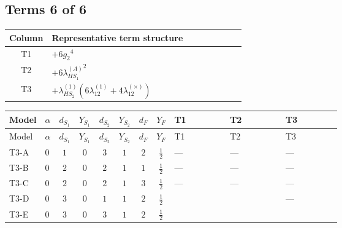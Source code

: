 \documentclass[8pt]{article}
\begin{document}
\begin{landscape}
\subsection*{Terms 6 of 6}
\begin{center}
\begin{tabular}{@{}c >{\raggedright\arraybackslash}p{0.82\linewidth}@{}}
\toprule
Column & Representative term structure \\
\midrule
T1 & \(\displaystyle +6 {g_2}^4\) \\
\midrule
T2 & \(\displaystyle +6 {\lambda_{HS_1}^{(A)}}^2\) \\
\midrule
T3 & \(\displaystyle +{\lambda_{HS_2}^{(1)}} (6 {\lambda_{12}^{(1)}}+4 {\lambda_{12}^{(\times)}})\) \\
\midrule
\bottomrule
\end{tabular}
\end{center}
\smallskip
\tiny
\begin{longtable}{@{}llcccccc >{\raggedright\arraybackslash}p{0.21\linewidth} >{\raggedright\arraybackslash}p{0.21\linewidth} >{\raggedright\arraybackslash}p{0.21\linewidth}@{}}
\toprule
Model & $\alpha$ & $d_{S_1}$ & $Y_{S_1}$ & $d_{S_2}$ & $Y_{S_2}$ & $d_F$ & $Y_F$ & T1 & T2 & T3 \\
\midrule
\endfirsthead
\toprule
Model & $\alpha$ & $d_{S_1}$ & $Y_{S_1}$ & $d_{S_2}$ & $Y_{S_2}$ & $d_F$ & $Y_F$ & T1 & T2 & T3 \\
\midrule
\endhead
T3-A & $0$ & $1$ & $0$ & $3$ & $1$ & $2$ & $\frac{1}{2}$ & --- & --- & --- \\
\midrule
T3-B & $0$ & $2$ & $0$ & $2$ & $1$ & $1$ & $\frac{1}{2}$ & --- & --- & --- \\
\midrule
T3-C & $0$ & $2$ & $0$ & $2$ & $1$ & $3$ & $\frac{1}{2}$ & --- & --- & --- \\
\midrule
T3-D & $0$ & $3$ & $0$ & $1$ & $1$ & $2$ & $\frac{1}{2}$ & \scriptsize\adjustbox{max width=\linewidth}{$\begin{gathered} +6 {g_2}^4\end{gathered}$} & \scriptsize\adjustbox{max width=\linewidth}{$\begin{gathered} +6 {\lambda_{HS_1}^{(A)}}^2\end{gathered}$} & --- \\
\midrule
T3-E & $0$ & $3$ & $0$ & $3$ & $1$ & $2$ & $\frac{1}{2}$ & \scriptsize\adjustbox{max width=\linewidth}{$\begin{gathered} +6 {g_2}^4\end{gathered}$} & \scriptsize\adjustbox{max width=\linewidth}{$\begin{gathered} +6 {\lambda_{HS_1}^{(A)}}^2\end{gathered}$} & \scriptsize\adjustbox{max width=\linewidth}{$\begin{gathered} +{\lambda_{HS_2}^{(1)}} (6 {\lambda_{12}^{(1)}}+4 {\lambda_{12}^{(\times)}})\end{gathered}$} \\
\midrule
\bottomrule
\end{longtable}
\clearpage

\end{landscape}
\end{document}
